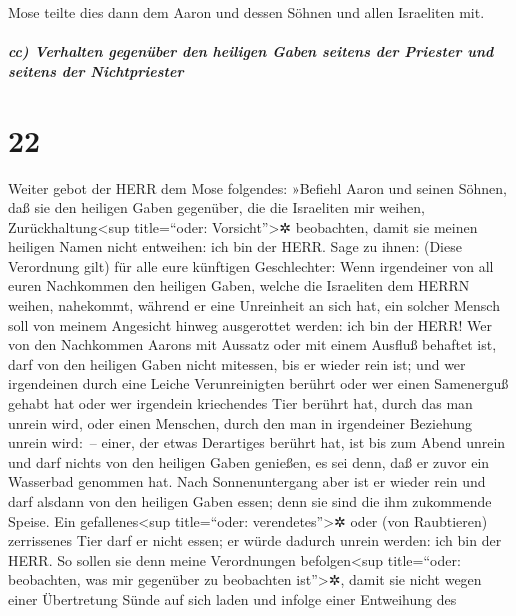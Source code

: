 Mose teilte dies dann dem Aaron und dessen Söhnen und
allen Israeliten mit.

\hypertarget{cc-verhalten-gegenuxfcber-den-heiligen-gaben-seitens-der-priester-und-seitens-der-nichtpriester}{%
\subparagraph{cc) Verhalten gegenüber den heiligen Gaben seitens der
Priester und seitens der
Nichtpriester}\label{cc-verhalten-gegenuxfcber-den-heiligen-gaben-seitens-der-priester-und-seitens-der-nichtpriester}}

\hypertarget{section-21}{%
\section{22}\label{section-21}}

Weiter gebot der HERR dem Mose folgendes:
»Befiehl Aaron und seinen Söhnen, daß sie den heiligen
Gaben gegenüber, die die Israeliten mir weihen,
Zurückhaltung\textless sup title=``oder: Vorsicht''\textgreater✲
beobachten, damit sie meinen heiligen Namen nicht entweihen: ich bin der
HERR. Sage zu ihnen: (Diese Verordnung gilt) für alle eure
künftigen Geschlechter: Wenn irgendeiner von all euren Nachkommen den
heiligen Gaben, welche die Israeliten dem HERRN weihen, nahekommt,
während er eine Unreinheit an sich hat, ein solcher Mensch soll von
meinem Angesicht hinweg ausgerottet werden: ich bin der HERR!
Wer von den Nachkommen Aarons mit Aussatz oder mit einem
Ausfluß behaftet ist, darf von den heiligen Gaben nicht mitessen, bis er
wieder rein ist; und wer irgendeinen durch eine Leiche Verunreinigten
berührt oder wer einen Samenerguß gehabt hat oder wer
irgendein kriechendes Tier berührt hat, durch das man unrein wird, oder
einen Menschen, durch den man in irgendeiner Beziehung unrein wird:~--
einer, der etwas Derartiges berührt hat, ist bis zum Abend
unrein und darf nichts von den heiligen Gaben genießen, es sei denn, daß
er zuvor ein Wasserbad genommen hat. Nach Sonnenuntergang
aber ist er wieder rein und darf alsdann von den heiligen Gaben essen;
denn sie sind die ihm zukommende Speise. Ein
gefallenes\textless sup title=``oder: verendetes''\textgreater✲ oder
(von Raubtieren) zerrissenes Tier darf er nicht essen; er würde dadurch
unrein werden: ich bin der HERR. So sollen sie denn meine
Verordnungen befolgen\textless sup title=``oder: beobachten, was mir
gegenüber zu beobachten ist''\textgreater✲, damit sie nicht wegen einer
Übertretung Sünde auf sich laden und infolge einer Entweihung des
